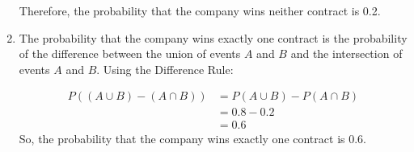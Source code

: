 \begin{solution}
\begin{enumerate}[label=(\alph*)]
        Therefore, the probability that the company wins neither contract is 0.2.
        
        \item The probability that the company wins exactly one contract is the probability of the difference between the union of events $A$ and $B$ and the intersection of events $A$ and $B$. Using the Difference Rule:
            
            \begin{align*}
                P((A \cup B) - (A \cap B)) &= P(A \cup B) - P(A \cap B) \\
                                            &= 0.8 - 0.2 \\
                                            &= 0.6
            \end{align*}
            So, the probability that the company wins exactly one contract is 0.6.
            \end{enumerate}
\end{solution}

\newpage

